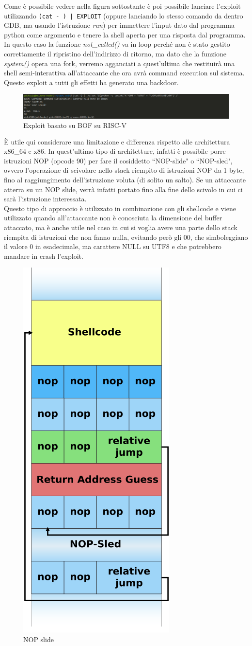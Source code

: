 \FloatBarrier
\vspace{1cm}
Come è possibile vedere nella figura sottostante è poi possibile lanciare l'exploit utilizzando \texttt{(cat - ) | EXPLOIT} (oppure lanciando lo stesso comando da dentro GDB, ma usando l'istruzione \textit{run}) per immettere l'input dato dal programma python come argomento e tenere la shell aperta per una risposta dal programma. In questo caso la funzione \textit{not\_called()} va in loop perché non è stato gestito correttamente il ripristino dell'indirizzo di ritorno, ma dato che la funzione \textit{system()} opera una fork, verremo agganciati a quest'ultima che restituirà una shell semi-interattiva all'attaccante che ora avrà command execution sul sistema. Questo exploit a tutti gli effetti ha generato una backdoor.
\vspace{1cm}
\FloatBarrier
\begin{figure}[!htbp]
    \centering
    \includegraphics[width=1\linewidth]{images/exploit_riscv_bof.png}
    \caption{Exploit basato su BOF su RISC-V}
\end{figure}
\FloatBarrier
\vspace{1cm}
È utile qui considerare una limitazione e differenza rispetto alle architettura x86\_64 e x86. In quest'ultimo tipo di architetture, infatti è possibile porre istruzioni NOP (opcode 90) \cite{NOP} per fare il cosiddetto ``NOP-slide" o ``NOP-sled", ovvero l'operazione di scivolare nello stack riempito di istruzioni NOP da 1 byte, fino al raggiungimento dell'istruzione voluta (di solito un salto). Se un attaccante atterra su un NOP slide, verrà infatti portato fino alla fine dello scivolo in cui ci sarà l'istruzione interessata. \\
Questo tipo di approccio è utilizzato in combinazione con gli shellcode e viene utilizzato quando all'attaccante non è conosciuta la dimensione del buffer attaccato, ma è anche utile nel caso in cui si voglia avere una parte dello stack riempita di istruzioni che non fanno nulla, evitando però gli 00, che simboleggiano il valore 0 in esadecimale, ma carattere NULL su UTF8 e che potrebbero mandare in crash l'exploit.
\vspace{1cm}
\FloatBarrier
\begin{figure}[!htbp]
    \centering
    \includegraphics[width=0.2\linewidth]{images/nop-slide.png}
    \caption{NOP slide}
\end{figure}
